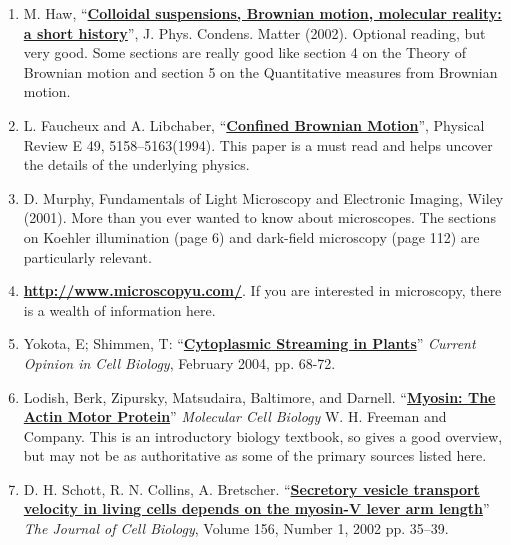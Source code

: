 \documentclass{../lab}
\begin{document}
\begin{enumerate}
    \item M. Haw, ``\href{http://physics111.lib.berkeley.edu/Physics111/Reprints/BMC/Colloidal\%20Suspensions\%20-\%20Haw.pdf}{\textbf{Colloidal suspensions, Brownian motion, molecular reality: a short history}}'', J. Phys. Condens. Matter (2002). Optional reading, but very good. Some sections are really good like section 4 on the Theory of Brownian motion and section 5 on the Quantitative measures from Brownian motion.

    \item L. Faucheux and A. Libchaber, ``\href{http://physics111.lib.berkeley.edu/Physics111/Reprints/BMC/BMC\_Reprints/Faucheux-Libchaber-Confined\_Brownian\_Motion.pdf}{\textbf{Confined Brownian Motion}}'', Physical Review E 49, 5158–5163(1994). This paper is a must read and helps uncover the details of the underlying physics.

    \item D. Murphy, Fundamentals of Light Microscopy and Electronic Imaging, Wiley (2001). More than you ever wanted to know about microscopes. The sections on Koehler illumination (page 6) and dark-field microscopy (page 112) are particularly relevant.

    \item \href{http://www.microscopyu.com/}{\textbf{http://www.microscopyu.com/}}. If you are interested in microscopy, there is a wealth of information here.

    \item Yokota, E; Shimmen, T: ``\href{http://physics111.lib.berkeley.edu/Physics111/Reprints/BMC/Cytoplasmic_Streaming-Shimmen.pdf}{\textbf{Cytoplasmic Streaming in Plants}}'' \emph{Current Opinion in Cell Biology}, February 2004, pp. 68-72.

    \item Lodish, Berk, Zipursky, Matsudaira, Baltimore, and Darnell. ``\href{http://physics111.lib.berkeley.edu/Physics111/Reprints/BMC/BMC\_Reprints/MyosinActinMotor.htm}{\textbf{Myosin: The Actin Motor Protein}}'' \emph{Molecular Cell Biology} W. H. Freeman and Company. This is an introductory biology textbook, so gives a good overview, but may not be as authoritative as some of the primary sources listed here.

    \item D. H. Schott, R. N. Collins, A. Bretscher. ``\href{http://physics111.lib.berkeley.edu/Physics111/Reprints/BMC/BMC\_Reprints/SecretoryVesicle-Schott.pdf}{\textbf{Secretory vesicle transport velocity in living cells depends on the myosin-V lever arm length}}'' \emph{The Journal of Cell Biology}, Volume 156, Number 1, 2002 pp. 35–39.
    

\end{enumerate}
\end{document}
